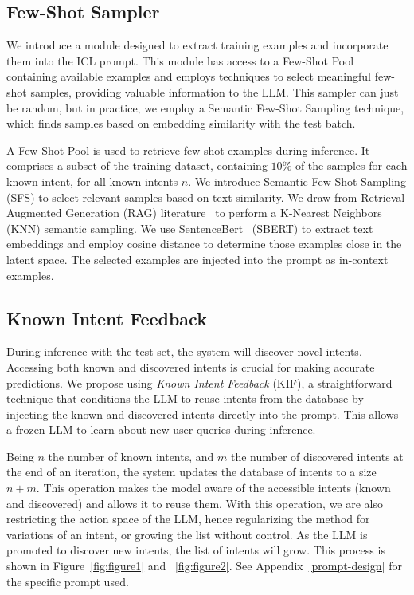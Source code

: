 \documentclass[11pt]{article}
\begin{document}
\subsection{Few-Shot Sampler}
We introduce a module designed to extract training examples and incorporate them into the ICL prompt. This module has access to a Few-Shot Pool containing available examples and employs techniques to select meaningful few-shot samples, providing valuable information to the LLM. This sampler can just be random, but in practice, we employ a Semantic Few-Shot Sampling technique, which finds samples based on embedding similarity with the test batch.

A Few-Shot Pool is used to retrieve few-shot examples during inference. It comprises a subset of the training dataset, containing $10\%$ of the samples for each known intent, for all known intents $n$. We introduce Semantic Few-Shot Sampling (SFS) to select relevant samples based on text similarity. We draw from Retrieval Augmented Generation (RAG) literature~\cite{lewis2020retrieval, izacard2022few} to perform a K-Nearest Neighbors (KNN) semantic sampling. We use SentenceBert~\citep{reimers2019sentence} (SBERT) to extract text embeddings and employ cosine distance to determine those examples close in the latent space. The selected examples are injected into the prompt as in-context examples.

\subsection{Known Intent Feedback}
During inference with the test set, the system will discover novel intents. Accessing both known and discovered intents is crucial for making accurate predictions. We propose using \textit{Known Intent Feedback} (KIF), a straightforward technique that conditions the LLM to reuse intents from the database by injecting the known and discovered intents directly into the prompt. This allows a frozen LLM to learn about new user queries during inference. 

Being $n$ the number of known intents, and $m$ the number of discovered intents at the end of an iteration, the system updates the database of intents to a size $n+m$. This operation makes the model aware of the accessible intents (known and discovered) and allows it to reuse them. With this operation, we are also restricting the action space of the LLM, hence regularizing the method for variations of an intent, or growing the list without control. As the LLM is promoted to discover new intents, the list of intents will grow. This process is shown in Figure~\ref{fig:figure1} and ~\ref{fig:figure2}. See Appendix~\ref{prompt-design} for the specific prompt used.
\end{document}

